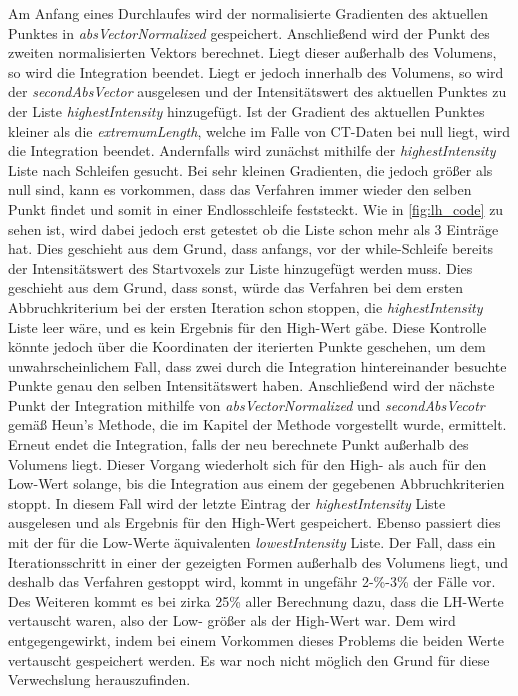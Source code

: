 Am Anfang eines Durchlaufes wird der normalisierte Gradienten des aktuellen Punktes in \textit{absVectorNormalized} gespeichert. Anschließend wird der Punkt des zweiten normalisierten Vektors berechnet. Liegt dieser außerhalb des Volumens, so wird die Integration beendet. Liegt er jedoch innerhalb des Volumens, so wird der \textit{secondAbsVector} ausgelesen und der Intensitätswert des aktuellen Punktes zu der Liste \textit{highestIntensity} hinzugefügt. Ist der Gradient des aktuellen Punktes kleiner als die \textit{extremumLength}, welche im Falle von CT-Daten bei null liegt, wird die Integration beendet.
\newline
Andernfalls wird zunächst mithilfe der \textit{highestIntensity} Liste nach Schleifen gesucht. Bei sehr kleinen Gradienten, die jedoch größer als null sind, kann es vorkommen, dass das Verfahren immer wieder den selben Punkt findet und somit in einer Endlosschleife feststeckt. Wie in \autoref{fig:lh_code} zu sehen ist, wird dabei jedoch erst getestet ob die Liste schon mehr als 3 Einträge hat. Dies geschieht aus dem Grund, dass anfangs, vor der while-Schleife bereits der Intensitätswert des Startvoxels zur Liste hinzugefügt werden muss. Dies geschieht aus dem Grund, dass sonst, würde das Verfahren bei dem ersten Abbruchkriterium bei der ersten Iteration schon stoppen, die \textit{highestIntensity} Liste leer wäre, und es kein Ergebnis für den High-Wert gäbe. Diese Kontrolle könnte jedoch über die Koordinaten der iterierten Punkte geschehen, um dem unwahrscheinlichem Fall, dass zwei durch die Integration hintereinander besuchte Punkte genau den selben Intensitätswert haben.
\newline
Anschließend wird der nächste Punkt der Integration mithilfe von \textit{absVectorNormalized} und \textit{secondAbsVecotr} gemäß Heun's Methode, die im Kapitel der Methode vorgestellt wurde, ermittelt. Erneut endet die Integration, falls der neu berechnete Punkt außerhalb des Volumens liegt.
\newline
Dieser Vorgang wiederholt sich für den High- als auch für den Low-Wert solange, bis die Integration aus einem der gegebenen Abbruchkriterien stoppt. In diesem Fall wird der letzte Eintrag der \textit{highestIntensity} Liste ausgelesen und als Ergebnis für den High-Wert gespeichert. Ebenso passiert dies mit der für die Low-Werte äquivalenten \textit{lowestIntensity} Liste.
\newline
Der Fall, dass ein Iterationsschritt in einer der gezeigten Formen außerhalb des Volumens liegt, und deshalb das Verfahren gestoppt wird, kommt in ungefähr 2-\%-3\% der Fälle vor. Des Weiteren kommt es bei zirka 25\% aller Berechnung dazu, dass die LH-Werte vertauscht waren, also der Low- größer als der High-Wert war. Dem wird entgegengewirkt, indem bei einem Vorkommen dieses Problems die beiden Werte vertauscht gespeichert werden. Es war noch nicht möglich den Grund für diese Verwechslung herauszufinden.



